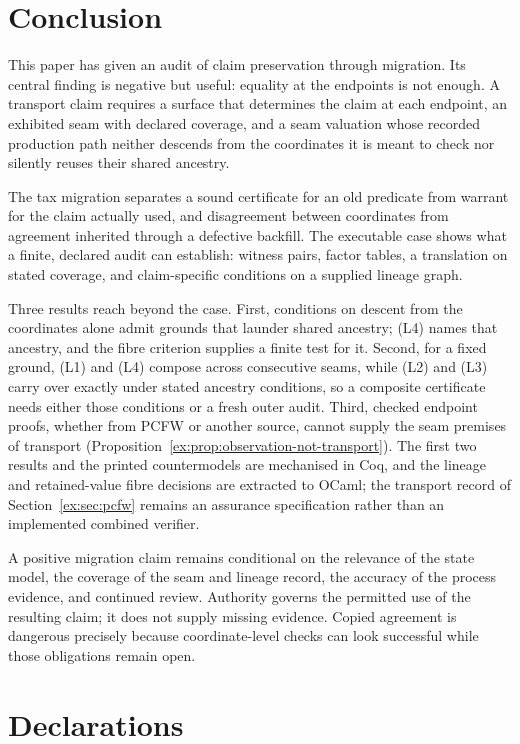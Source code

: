 \documentclass[twocolumn,envcountsect,envcountsame,natbib]{svjour3}
\begin{document}
\section{Conclusion}\label{ex:sec:conclusion}
This paper has given an audit of claim preservation through migration. Its central finding is negative but useful: equality at the endpoints is not enough. A transport claim requires a surface that determines the claim at each endpoint, an exhibited seam with declared coverage, and a seam valuation whose recorded production path neither descends from the coordinates it is meant to check nor silently reuses their shared ancestry.

The tax migration separates a sound certificate for an old predicate from warrant for the claim actually used, and disagreement between coordinates from agreement inherited through a defective backfill. The executable case shows what a finite, declared audit can establish: witness pairs, factor tables, a translation on stated coverage, and claim-specific conditions on a supplied lineage graph.

Three results reach beyond the case. First, conditions on descent from the coordinates alone admit grounds that launder shared ancestry; (L4) names that ancestry, and the fibre criterion supplies a finite test for it. Second, for a fixed ground, (L1) and (L4) compose across consecutive seams, while (L2) and (L3) carry over exactly under stated ancestry conditions, so a composite certificate needs either those conditions or a fresh outer audit. Third, checked endpoint proofs, whether from PCFW or another source, cannot supply the seam premises of transport (Proposition~\ref{ex:prop:observation-not-transport}). The first two results and the printed countermodels are mechanised in Coq, and the lineage and retained-value fibre decisions are extracted to OCaml; the transport record of Section~\ref{ex:sec:pcfw} remains an assurance specification rather than an implemented combined verifier.

A positive migration claim remains conditional on the relevance of the state model, the coverage of the seam and lineage record, the accuracy of the process evidence, and continued review. Authority governs the permitted use of the resulting claim; it does not supply missing evidence. Copied agreement is dangerous precisely because coordinate-level checks can look successful while those obligations remain open.


\section*{Declarations}
\end{document}
